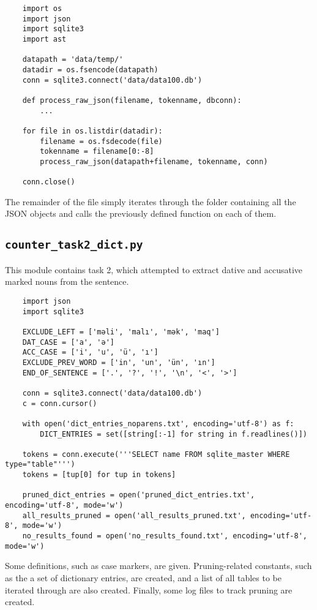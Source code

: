 \documentclass{article}      %
\begin{document}
	\begin{verbatim}
	import os
	import json
	import sqlite3
	import ast
	
	datapath = 'data/temp/'
	datadir = os.fsencode(datapath)
	conn = sqlite3.connect('data/data100.db')

	def process_raw_json(filename, tokenname, dbconn):
		...
		
	for file in os.listdir(datadir):
		filename = os.fsdecode(file)
		tokenname = filename[0:-8]
		process_raw_json(datapath+filename, tokenname, conn)
	
	conn.close()
	\end{verbatim}
	
	The remainder of the file simply iterates through the folder containing all the JSON objects and calls the previously defined function on each of them.
	
	\subsection{\texttt{counter\_task2\_dict.py}}
	
	This module contains task 2, which attempted to extract dative and accusative marked nouns from the sentence.
	
	\begin{verbatim}
	import json
	import sqlite3
	
	EXCLUDE_LEFT = ['məli', 'malı', 'mək', 'maq']
	DAT_CASE = ['a', 'ə']
	ACC_CASE = ['i', 'u', 'ü', 'ı']
	EXCLUDE_PREV_WORD = ['in', 'un', 'ün', 'ın']
	END_OF_SENTENCE = ['.', '?', '!', '\n', '<', '>']
	
	conn = sqlite3.connect('data/data100.db')
	c = conn.cursor()
	
	with open('dict_entries_noparens.txt', encoding='utf-8') as f:
		DICT_ENTRIES = set([string[:-1] for string in f.readlines()])
	
	tokens = conn.execute('''SELECT name FROM sqlite_master WHERE type="table"''')
	tokens = [tup[0] for tup in tokens]
	
	pruned_dict_entries = open('pruned_dict_entries.txt', encoding='utf-8', mode='w')
	all_results_pruned = open('all_results_pruned.txt', encoding='utf-8', mode='w')
	no_results_found = open('no_results_found.txt', encoding='utf-8', mode='w')
	\end{verbatim}
	
	Some definitions, such as case markers, are given. Pruning-related constants, such as the a set of dictionary entries, are created, and a list of all tables to be iterated through are also created. Finally, some log files to track pruning are created.
	
\end{document}
